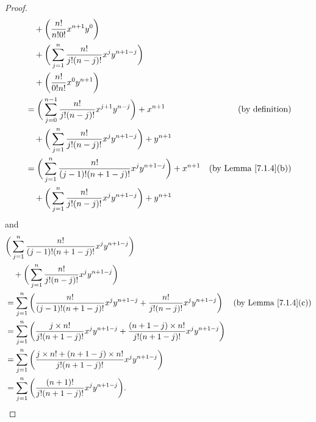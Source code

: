 \begin{proof}
\begin{align*}
                        & \quad + \bigg(\frac{n!}{n!0!} x^{n + 1} y^0\bigg)                                                                               \\
                        & \quad + \bigg(\sum_{j = 1}^n \frac{n!}{j!(n - j)!} x^j y^{n + 1 - j}\bigg)                                                      \\
                        & \quad + \bigg(\frac{n!}{0!n!} x^0 y^{n + 1}\bigg)                                                                               \\
                        & = \bigg(\sum_{j = 0}^{n - 1} \frac{n!}{j!(n - j)!} x^{j + 1} y^{n - j}\bigg) + x^{n + 1}   & \text{(by definition)}             \\
                        & \quad + \bigg(\sum_{j = 1}^n \frac{n!}{j!(n - j)!} x^j y^{n + 1 - j}\bigg) + y^{n + 1}                                          \\
                        & = \bigg(\sum_{j = 1}^n \frac{n!}{(j - 1)!(n + 1 - j)!} x^j y^{n + 1 - j}\bigg) + x^{n + 1} & \text{(by Lemma \ref{7.1.4}(b))}   \\
                        & \quad + \bigg(\sum_{j = 1}^n \frac{n!}{j!(n - j)!} x^j y^{n + 1 - j}\bigg) + y^{n + 1}
    \end{align*}
    and
    \begin{align*}
         & \bigg(\sum_{j = 1}^n \frac{n!}{(j - 1)!(n + 1 - j)!} x^j y^{n + 1 - j}\bigg)                                                                                                          \\
         & \quad + \bigg(\sum_{j = 1}^n \frac{n!}{j!(n - j)!} x^j y^{n + 1 - j}\bigg)                                                                                                            \\
         & = \sum_{j = 1}^n \bigg(\frac{n!}{(j - 1)!(n + 1 - j)!} x^j y^{n + 1 - j} + \frac{n!}{j!(n - j)!} x^j y^{n + 1 - j}\bigg)                           & \text{(by Lemma \ref{7.1.4}(c))} \\
         & = \sum_{j = 1}^n \bigg(\frac{j \times n!}{j!(n + 1 - j)!} x^j y^{n + 1 - j} + \frac{(n + 1 - j) \times n!}{j!(n + 1 - j)!} x^j y^{n + 1 - j}\bigg)                                    \\
         & = \sum_{j = 1}^n \bigg(\frac{j \times n! + (n + 1 - j) \times n!}{j!(n + 1 - j)!} x^j y^{n + 1 - j}\bigg)                                                                             \\
         & = \sum_{j = 1}^n \bigg(\frac{(n + 1)!}{j!(n + 1 - j)!} x^j y^{n + 1 - j}\bigg).

\end{align*}
\end{proof}
